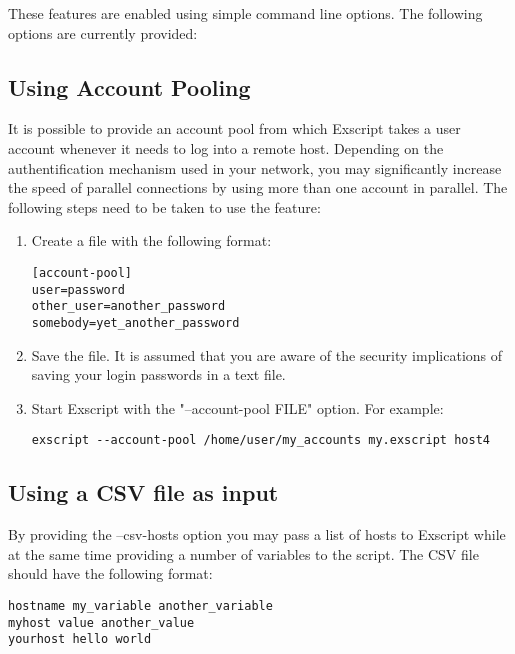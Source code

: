These features are enabled using simple command line options. The following 
options are currently provided:




\subsection{Using Account Pooling}

It is possible to provide an account pool from which Exscript takes a 
user account whenever it needs to log into a remote host. Depending on 
the authentification mechanism used in your network, you may significantly 
increase the speed of parallel connections by using more than one account 
in parallel. The following steps need to be taken to use the feature:

\begin{enumerate}
\item Create a file with the following format:

\begin{lstlisting}
[account-pool]
user=password
other_user=another_password
somebody=yet_another_password
\end{lstlisting}

\item Save the file. It is assumed that you are aware of the security 
implications of saving your login passwords in a text file.
\item Start Exscript with the "--account-pool FILE" option. For example:

\begin{lstlisting}
exscript --account-pool /home/user/my_accounts my.exscript host4
\end{lstlisting}
\end{enumerate}


\subsection{Using a CSV file as input}

By providing the --csv-hosts option you may pass a list of hosts to 
Exscript while at the same time providing a number of variables to 
the script. The CSV file should have the following format: 

\begin{lstlisting}
hostname my_variable another_variable
myhost value another_value
yourhost hello world
\end{lstlisting}


